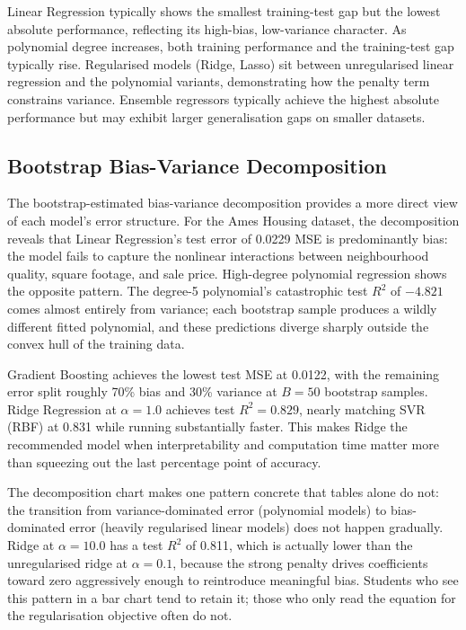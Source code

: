 \documentclass[conference]{IEEEtran}
\begin{document}
Linear Regression typically shows the smallest training-test gap but the lowest absolute performance, reflecting its high-bias, low-variance character. As polynomial degree increases, both training performance and the training-test gap typically rise. Regularised models (Ridge, Lasso) sit between unregularised linear regression and the polynomial variants, demonstrating how the penalty term constrains variance. Ensemble regressors typically achieve the highest absolute performance but may exhibit larger generalisation gaps on smaller datasets.

\subsection{Bootstrap Bias-Variance Decomposition}

The bootstrap-estimated bias-variance decomposition provides a more direct view of each model's error structure. For the Ames Housing dataset, the decomposition reveals that Linear Regression's test error of 0.0229 MSE is predominantly bias: the model fails to capture the nonlinear interactions between neighbourhood quality, square footage, and sale price. High-degree polynomial regression shows the opposite pattern. The degree-5 polynomial's catastrophic test $R^2$ of $-4.821$ comes almost entirely from variance; each bootstrap sample produces a wildly different fitted polynomial, and these predictions diverge sharply outside the convex hull of the training data.

Gradient Boosting achieves the lowest test MSE at 0.0122, with the remaining error split roughly 70\% bias and 30\% variance at $B=50$ bootstrap samples. Ridge Regression at $\alpha=1.0$ achieves test $R^2 = 0.829$, nearly matching SVR (RBF) at 0.831 while running substantially faster. This makes Ridge the recommended model when interpretability and computation time matter more than squeezing out the last percentage point of accuracy.

The decomposition chart makes one pattern concrete that tables alone do not: the transition from variance-dominated error (polynomial models) to bias-dominated error (heavily regularised linear models) does not happen gradually. Ridge at $\alpha=10.0$ has a test $R^2$ of 0.811, which is actually lower than the unregularised ridge at $\alpha=0.1$, because the strong penalty drives coefficients toward zero aggressively enough to reintroduce meaningful bias. Students who see this pattern in a bar chart tend to retain it; those who only read the equation for the regularisation objective often do not.
\end{document}
